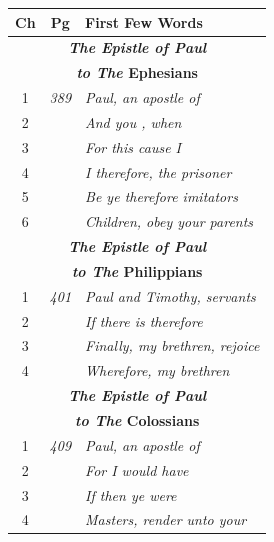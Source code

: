 \documentclass{article}
\newlength{\minipageheight}
\newlength{\minipagewidth}
\begin{document}
%
\begin{minipage}[r][\minipageheight][t]{3.3in}%
    \begin{longtable}{ccl}
        \textbf{Ch} & \textbf{Pg}  & \textbf{First Few Words}                     \\%
        \hline%
        \endfirsthead%
        \multicolumn{3}{c}{\textbf{\textit{The Epistle of Paul}}}                 \\
        \multicolumn{3}{c}{\textbf{\textit{to The} Ephesians}}                    \\
        \hline
        1           & \textit{389} & \textit{Paul, an apostle of}                 \\
        2           &              & \textit{And you , when}                      \\
        3           &              & \textit{For this cause I}                    \\
        4           &              & \textit{I therefore, the prisoner}           \\
        5           &              & \textit{Be ye therefore imitators}           \\
        6           &              & \textit{Children, obey your parents}         \\

        \multicolumn{3}{c}{\textbf{\textit{The Epistle of Paul}}}                 \\
        \multicolumn{3}{c}{\textbf{\textit{to The} Philippians}}                  \\
        \hline
        1           & \textit{401} & \textit{Paul and Timothy, servants}          \\
        2           &              & \textit{If there is therefore}               \\
        3           &              & \textit{Finally, my brethren, rejoice}       \\
        4           &              & \textit{Wherefore, my brethren}              \\%

        \multicolumn{3}{c}{\textbf{\textit{The Epistle of Paul}}}                 \\
        \multicolumn{3}{c}{\textbf{\textit{to The} Colossians}}                   \\
        \hline
        1           & \textit{409} & \textit{Paul, an apostle of}                 \\
        2           &              & \textit{For I would have}                    \\
        3           &              & \textit{If then ye were}                     \\
        4           &              & \textit{Masters, render unto your}           \\


\end{longtable}
\end{minipage}
\end{document}
